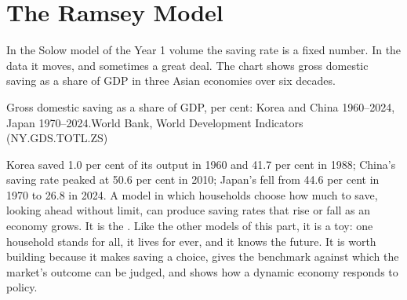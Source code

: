 \chapter{The Ramsey Model}\label{ch:b2:ramsey-model}

In the Solow model of the Year 1 volume the saving rate is a fixed number. In the data it moves, and sometimes a great
deal. The chart shows gross domestic saving as a share of GDP in three Asian economies over six decades.

\begin{openingchart}{Gross domestic saving as a share of GDP, per cent: Korea and China 1960--2024, Japan
  1970--2024.}{World Bank, World Development Indicators (NY.GDS.TOTL.ZS)}
\end{openingchart}

Korea saved 1.0 per cent of its output in 1960 and 41.7 per cent in 1988; China's saving rate peaked at 50.6 per cent in 2010; Japan's fell from 44.6 per cent in 1970 to 26.8 in 2024.
A model in which households choose how much to save, looking ahead without limit, can produce saving rates that rise or
fall as an economy grows. It is the . Like the other models of this part, it is a toy: one household stands
for all, it lives for ever, and it knows the future. It is worth building because it makes saving a choice, gives the
benchmark against which the market's outcome can be judged, and shows how a dynamic economy responds to policy.

